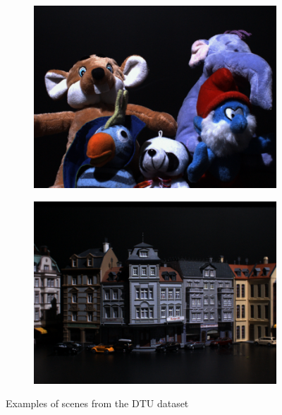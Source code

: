 \documentclass[thesis.tex]{subfiles}
\begin{document}
\begin{figure}[tb]
\begin{subfigure}{0.49\textwidth}
	\end{subfigure}
	\par\medskip
	\begin{subfigure}{0.49\textwidth}
		\includegraphics[width=\textwidth]{img/dtu_example_3.png}
	\end{subfigure}
	\hfill
	\begin{subfigure}{0.49\textwidth}
		\includegraphics[width=\textwidth]{img/dtu_example_4.png}
	\end{subfigure}
	\caption{Examples of scenes from the DTU dataset}
	\label{fig:dtu_examples}
\end{figure}
\end{document}
